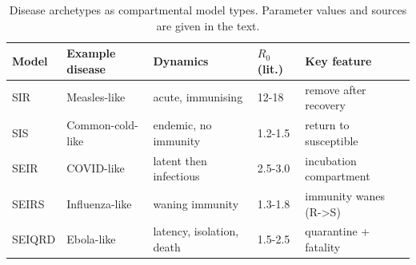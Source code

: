 \begin{table}[t]
\centering
\caption{Disease archetypes as compartmental model types. Parameter values and sources are given in the text.}
\label{tab:archetypes}
\begin{tabular}{lllll}
\toprule
Model & Example disease & Dynamics & $R_0$ (lit.) & Key feature \\
\midrule
SIR & Measles-like & acute, immunising & 12-18 & remove after recovery \\
SIS & Common-cold-like & endemic, no immunity & 1.2-1.5 & return to susceptible \\
SEIR & COVID-like & latent then infectious & 2.5-3.0 & incubation compartment \\
SEIRS & Influenza-like & waning immunity & 1.3-1.8 & immunity wanes (R->S) \\
SEIQRD & Ebola-like & latency, isolation, death & 1.5-2.5 & quarantine + fatality \\
\bottomrule
\end{tabular}
\end{table}
